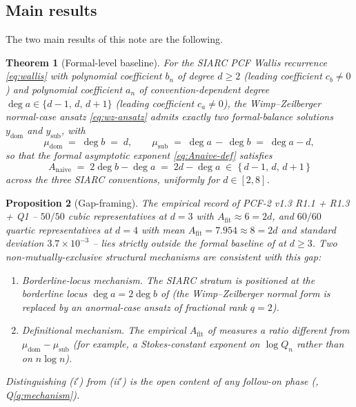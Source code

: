 \documentclass[11pt,reqno]{amsart}
\theoremstyle{plain}
\newtheorem{theorem}{Theorem}[section]
\newtheorem{proposition}[theorem]{Proposition}
\theoremstyle{definition}
\theoremstyle{remark}
\newcommand{\Anaive}{A_{\mathrm{naive}}}
\newcommand{\Afit}{A_{\mathrm{fit}}}
\newcommand{\dega}{\deg a}
\newcommand{\degb}{\deg b}
\begin{document}
\subsection{Main results}
\label{sec:main-results}

The two main results of this note are the following.

\begin{theorem}[Formal-level baseline]
\label{thm:baseline}
For the SIARC PCF Wallis recurrence \eqref{eq:wallis} with
polynomial coefficient $b_n$ of degree $d \ge 2$ (leading
coefficient $c_b \ne 0$) and polynomial coefficient $a_n$ of
convention-dependent degree
$\dega \in \{d-1,\,d,\,d+1\}$
(leading coefficient $c_a \ne 0$), the Wimp--Zeilberger
normal-case ansatz \eqref{eq:wz-ansatz} admits exactly two
formal-balance solutions $y_{\mathrm{dom}}$ and
$y_{\mathrm{sub}}$, with
\begin{equation}
\label{eq:mu-pair}
  \mu_{\mathrm{dom}} \;=\; \degb \;=\; d,
  \qquad
  \mu_{\mathrm{sub}} \;=\; \dega \,-\, \degb \;=\; \dega - d,
\end{equation}
so that the formal asymptotic exponent
\eqref{eq:Anaive-def} satisfies
\begin{equation}
\label{eq:Anaive-band}
  \Anaive \;=\; 2\degb - \dega \;=\; 2d - \dega
  \;\in\; \{\,d-1,\,d,\,d+1\,\}
\end{equation}
across the three SIARC conventions, uniformly for
$d \in [2, 8]$.
\end{theorem}

\begin{proposition}[Gap-framing]
\label{prop:gap-framing}
The empirical record of PCF-2 v1.3 R1.1 + R1.3 + Q1
\cite{papanokechi_pcf2_v13} -- $50/50$ cubic representatives
at $d=3$ with $\Afit \approx 6 = 2d$, and $60/60$ quartic
representatives at $d=4$ with mean $\Afit = 7.954 \approx 8 = 2d$
and standard deviation $3.7 \times 10^{-3}$ -- lies strictly
outside the formal baseline of  at $d \ge 3$.
Two non-mutually-exclusive structural mechanisms are consistent
with this gap:
\begin{enumerate}[label=\textup{(\roman*$'$)},leftmargin=2.4em]
\item \emph{Borderline-locus mechanism.} The SIARC stratum is
positioned at the \emph{borderline} locus $\dega = 2\degb$ of
\cite[\S5]{wimp1984computation} (the Wimp--Zeilberger normal
form is replaced by an anormal-case ansatz of fractional rank
$q = 2$).
\item \emph{Definitional mechanism.} The empirical $\Afit$ of
\cite{papanokechi_pcf2_v13} measures a ratio different from
$\mu_{\mathrm{dom}} - \mu_{\mathrm{sub}}$ (for example, a
Stokes-constant exponent on $\log Q_n$ rather than on
$n \log n$).
\end{enumerate}
Distinguishing \textup{(i$'$)} from \textup{(ii$'$)} is
the open content of any follow-on phase
(, Q\ref{q:mechanism}).
\end{proposition}
\end{document}
